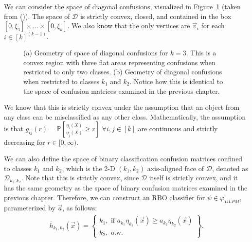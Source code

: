 \documentclass[
  letterpaper,
  numbers=noenddot,
  DIV=11,
  oneside]{scrreprt}
\theoremstyle{remark}
\begin{document}
We can consider the space of diagonal confusions, visualized in
Figure~\ref{fig-diag_geom} (taken from
()). The
space of \(\mathcal{D}\) is strictly convex, closed, and contained in
the box \([0, \xi_1] \times \dots \times [0, \xi_k]\). We also know that
the only vertices are \(\vec{v}_i\) for each \(i \in [k]^{(k-1)}\).

\begin{figure}


\caption{\label{fig-diag_geom}(a) Geometry of space of diagonal
confusions for \(k=3\). This is a convex region with three flat areas
representing confusions when restricted to only two classes. (b)
Geometry of diagonal confusions when restricted to classes \(k_1\) and
\(k_2\). Notice how this is identical to the space of confusion matrices
examined in the previous chapter.}

\end{figure}%

We know that this is strictly convex under the assumption that an object
from any class can be misclassified as any other class. Mathematically,
the assumption is that
\(g_{ij}(r) = \mathbb{P} \left[\frac{\eta_i(X)}{\eta_j(X)} \geq r \right]\)
\(\forall i, j \in [k]\) are continuous and strictly decreasing for
\(r \in [0, \infty)\).

We can also define the space of binary classification confusion matrices
confined to classes \(k_1\) and \(k_2\), which is the 2-D \((k_1, k_2)\)
axis-aligned face of \(\mathcal{D}\), denoted as
\(\mathcal{D}_{k_1, k_2}\). Note that this is strictly convex, since
\(\mathcal{D}\) itself is strictly convex, and it has the same geometry
as the space of binary confusion matrices examined in the previous
chapter. Therefore, we can construct an RBO classifier for
\(\psi \in \varphi_{DLPM}\), parameterized by \(\vec{a}\), as follows:
\[\begin{aligned}
\bar{h}_{k_1, k_2}(\vec{x})= \left\{
\begin{array}{ll}
      k_1, \text{ if } a_{k_1} \eta_{k_1}(\vec{x}) \geq a_{k_2} \eta_{k_2}(\vec{x})\\
k_2, \text{ o.w.}
\end{array}
\right\}.
\end{aligned}\]
\end{document}
